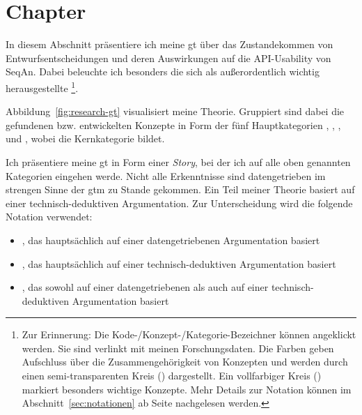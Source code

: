 \documentclass[11pt,a4paper]{book}
\newcommand{\fref}[1]{Abbildung~\ref{#1}}
\newcommand{\sref}[1]{Abschnitt~\ref{#1}}
\begin{document}
\sloppy

\chapter{Chapter}

In diesem Abschnitt präsentiere ich meine \gls{gt} über das Zustandekommen von Entwurfsentscheidungen und deren Auswirkungen auf die API-Usability von SeqAn. Dabei beleuchte ich besonders die sich als außerordentlich wichtig herausgestellte \footnote{Zur Erinnerung: Die Kode-/Konzept-/Kategorie-Bezeichner können angeklickt werden. Sie sind verlinkt mit meinen Forschungsdaten. Die Farben geben Aufschluss über die Zusammengehörigkeit von Konzepten und werden durch einen semi-transparenten Kreis () dargestellt. Ein vollfarbiger Kreis () markiert besonders wichtige Konzepte. Mehr Details zur Notation können im \sref{sec:notationen} ab Seite \pageref{sec:notationen} nachgelesen werden.}.

\fref{fig:research-gt} visualisiert meine Theorie. Gruppiert sind dabei die gefundenen bzw. entwickelten Konzepte in Form der fünf Hauptkategorien , , ,  und , wobei  die Kernkategorie bildet.

Ich präsentiere meine \gls{gt} in Form einer \textit{Story}, bei der ich auf alle oben genannten Kategorien eingehen werde. Nicht alle Erkenntnisse sind datengetrieben im strengen Sinne der \gls{gtm} zu Stande gekommen. Ein Teil meiner Theorie basiert auf einer technisch-deduktiven Argumentation. Zur Unterscheidung wird die folgende Notation verwendet:

\begin{itemize}
  \item[] , das hauptsächlich auf einer datengetriebenen Argumentation basiert
  \item[] , das hauptsächlich auf einer technisch-deduktiven Argumentation basiert
  \item[] , das sowohl auf einer datengetriebenen als auch auf einer technisch-deduktiven Argumentation basiert
\end{itemize}
\end{document}
